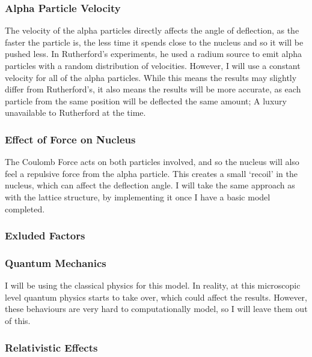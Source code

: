 \documentclass[11pt]{article}
\begin{document}
\hypertarget{alpha-particle-velocity}{%
\subsubsection*{Alpha Particle Velocity}\label{alpha-particle-velocity}}
%
The velocity of the alpha particles directly affects the angle of
deflection, as the faster the particle is, the less time it spends close
to the nucleus and so it will be pushed less. In Rutherford's
experiments, he used a radium source to emit alpha particles with a
random distribution of velocities. However, I will use a constant
velocity for all of the alpha particles. While this means the results
may slightly differ from Rutherford's, it also means the results will be
more accurate, as each particle from the same position will be deflected
the same amount; A luxury unavailable to Rutherford at the time.

\hypertarget{effect-of-force-on-nucleus}{%
\subsubsection*{Effect of Force on
Nucleus}\label{effect-of-force-on-nucleus}}

The Coulomb Force acts on both particles involved, and so the nucleus
will also feel a repulsive force from the alpha particle. This creates a
small `recoil' in the nucleus, which can affect the deflection angle. I
will take the same approach as with the lattice structure, by
implementing it once I have a basic model completed.

\hypertarget{exluded-factors}{%
\subsubsection{Exluded Factors}\label{exluded-factors}}

\hypertarget{quantum-mechanics}{%
\subsubsection*{Quantum Mechanics}\label{quantum-mechanics}}

I will be using the classical physics for this model. In reality, at
this microscopic level quantum physics starts to take over, which could
affect the results. However, these behaviours are very hard to
computationally model, so I will leave them out of this.

\hypertarget{relativistic-effects}{%
\subsubsection*{Relativistic Effects}\label{relativistic-effects}}
\end{document}
